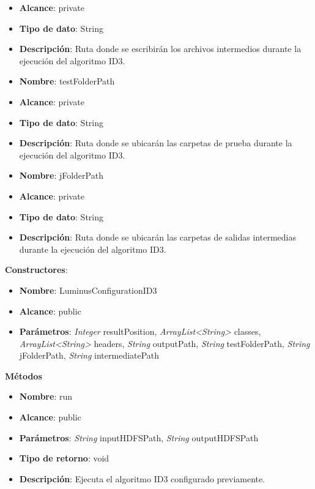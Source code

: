 \begin{UClist}
\begin{itemize}
		\item \textbf{Alcance}: private
		\item \textbf{Tipo de dato}: String
		\item \textbf{Descripción}: Ruta donde se escribirán los archivos intermedios durante la ejecución del algoritmo ID3.\\
	\end{itemize}
	\begin{itemize}
		\item \textbf{Nombre}: testFolderPath
		\item \textbf{Alcance}: private
		\item \textbf{Tipo de dato}: String
		\item \textbf{Descripción}: Ruta donde se ubicarán las carpetas de prueba durante la ejecución del algoritmo ID3.\\
	\end{itemize}
	\begin{itemize}
		\item \textbf{Nombre}: jFolderPath
		\item \textbf{Alcance}: private
		\item \textbf{Tipo de dato}: String
		\item \textbf{Descripción}: Ruta donde se ubicarán las carpetas de salidas intermedias durante la ejecución del algoritmo ID3.\\
	\end{itemize}
\end{UClist}
\textbf{Constructores}:
\begin{UClist}
	\begin{itemize}
		\item \textbf{Nombre}: LuminusConfigurationID3
		\item \textbf{Alcance}: public
		\item \textbf{Parámetros}: \emph{Integer} resultPosition, \emph{ArrayList<String>} classes, \emph{ArrayList<String>} headers, \emph{String} outputPath, \emph{String} testFolderPath, \emph{String} jFolderPath, \emph{String} intermediatePath\\
	\end{itemize}
\end{UClist}
\textbf{Métodos}
\begin{itemize}
		\item \textbf{Nombre}: run
		\item \textbf{Alcance}: public
		\item \textbf{Parámetros}: \emph{String} inputHDFSPath, \emph{String} outputHDFSPath
		\item \textbf{Tipo de retorno}: void
		\item \textbf{Descripción}: Ejecuta el algoritmo ID3 configurado previamente.\\
\end{itemize}
